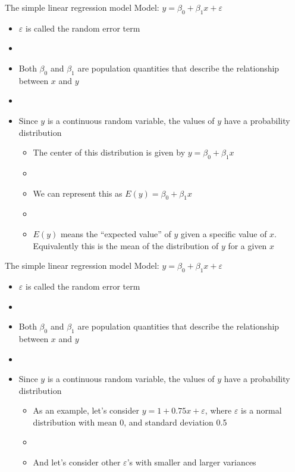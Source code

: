 \documentclass[xcolor=dvipsnames]{beamer}
\begin{document}
\begin{frame}{The simple linear regression model}
Model: $y = \beta_0 + \beta_1 x + \varepsilon$
\begin{itemize}
	\item $\varepsilon$ is called the random error term \pause
	\item[]
	\item Both $\beta_0$ and $\beta_1$ are population quantities that describe the relationship between $x$ and $y$ \pause
	\item[] 
	\item Since $y$ is a continuous random variable, the values of $y$ have a probability distribution \pause
	\begin{itemize}
		\item The center of this distribution is given by $y = \beta_0 + \beta_1 x $ \pause
		\item[]
		\item We can represent this as $E(y) = \beta_0 + \beta_1 x$ \pause
		\item[] 
		\item $E(y)$ means the ``expected value'' of $y$ given a specific value of $x$. Equivalently this is the mean of the distribution of $y$ for a given $x$ 
	\end{itemize}
\end{itemize}
\end{frame}

\begin{frame}{The simple linear regression model}
Model: $y = \beta_0 + \beta_1 x + \varepsilon$ \pause 
\begin{itemize}
	\item $\varepsilon$ is called the random error term \pause
	\item[]
	\item Both $\beta_0$ and $\beta_1$ are population quantities that describe the relationship between $x$ and $y$ \pause
	\item[] 
	\item Since $y$ is a continuous random variable, the values of $y$ have a probability distribution \pause
	\begin{itemize}
		\item As an example, let's consider $y = 1 + 0.75x + \varepsilon$, where $\varepsilon$ is a normal distribution with mean 0, and standard deviation 0.5 \pause
		\item[]
		\item And let's consider other $\varepsilon$'s with smaller and larger variances
	\end{itemize}
\end{itemize}
\end{frame}
\end{document}
